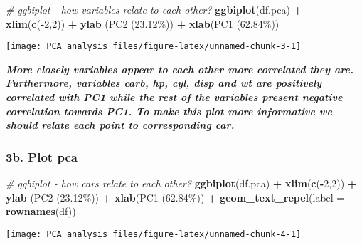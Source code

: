 \documentclass[
  5pt,
]{article}
\newenvironment{Shaded}{\begin{snugshade}}{\end{snugshade}}
\newcommand{\AttributeTok}[1]{\textcolor[rgb]{0.13,0.29,0.53}{#1}}
\newcommand{\CommentTok}[1]{\textcolor[rgb]{0.56,0.35,0.01}{\textit{#1}}}
\newcommand{\DecValTok}[1]{\textcolor[rgb]{0.00,0.00,0.81}{#1}}
\newcommand{\FunctionTok}[1]{\textcolor[rgb]{0.13,0.29,0.53}{\textbf{#1}}}
\newcommand{\NormalTok}[1]{#1}
\newcommand{\SpecialCharTok}[1]{\textcolor[rgb]{0.81,0.36,0.00}{\textbf{#1}}}
\newcommand{\StringTok}[1]{\textcolor[rgb]{0.31,0.60,0.02}{#1}}
\begin{document}
\begin{Shaded}
\begin{Highlighting}[]
\CommentTok{\# ggbiplot {-} how variables relate to each other?}
\FunctionTok{ggbiplot}\NormalTok{(df.pca) }\SpecialCharTok{+} \FunctionTok{xlim}\NormalTok{(}\FunctionTok{c}\NormalTok{(}\SpecialCharTok{{-}}\DecValTok{2}\NormalTok{,}\DecValTok{2}\NormalTok{)) }\SpecialCharTok{+} \FunctionTok{ylab}\NormalTok{ (}\StringTok{\textquotesingle{}PC2 (23.12\%)\textquotesingle{}}\NormalTok{) }\SpecialCharTok{+} \FunctionTok{xlab}\NormalTok{(}\StringTok{\textquotesingle{}PC1 (62.84\%)\textquotesingle{}}\NormalTok{)}
\end{Highlighting}
\end{Shaded}

\begin{center}\texttt{[image: PCA\_analysis\_files/figure-latex/unnamed-chunk-3-1]} \end{center}

\textbf{\emph{More closely variables appear to each other more
correlated they are. Furthermore, variables carb, hp, cyl, disp and wt
are positively correlated with PC1 while the rest of the variables
present negative correlation towards PC1. To make this plot more
informative we should relate each point to corresponding car.}}

\pagebreak

\subsubsection{3b. Plot pca}\label{b.-plot-pca}

\begin{Shaded}
\begin{Highlighting}[]
\CommentTok{\# ggbiplot {-} how cars relate to each other?}
\FunctionTok{ggbiplot}\NormalTok{(df.pca) }\SpecialCharTok{+} \FunctionTok{xlim}\NormalTok{(}\FunctionTok{c}\NormalTok{(}\SpecialCharTok{{-}}\DecValTok{2}\NormalTok{,}\DecValTok{2}\NormalTok{)) }\SpecialCharTok{+}  \FunctionTok{ylab}\NormalTok{ (}\StringTok{\textquotesingle{}PC2 (23.12\%)\textquotesingle{}}\NormalTok{) }\SpecialCharTok{+} 
                  \FunctionTok{xlab}\NormalTok{(}\StringTok{\textquotesingle{}PC1 (62.84\%)\textquotesingle{}}\NormalTok{) }\SpecialCharTok{+} \FunctionTok{geom\_text\_repel}\NormalTok{(}\AttributeTok{label =} \FunctionTok{rownames}\NormalTok{(df))}
\end{Highlighting}
\end{Shaded}

\begin{center}\texttt{[image: PCA\_analysis\_files/figure-latex/unnamed-chunk-4-1]} \end{center}
\end{document}
